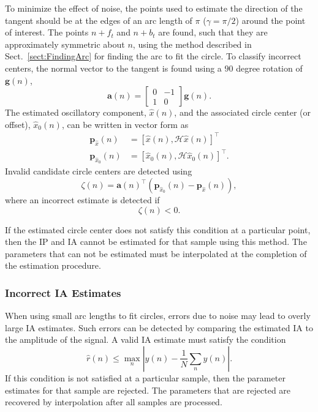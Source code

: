 \documentclass[11pt,draftcls,onecolumn]{IEEEtran}
\begin{document}
To minimize the effect of noise, the points used to estimate the direction of the tangent should be at the edges of an arc length of $\pi$ ($\gamma = \pi/2$) around the point of interest. The points $n+f_t$ and $n+b_t$ are found, such that they are approximately symmetric about $n$, using the method described in Sect.~\ref{sect:FindingArc} for finding the arc to fit the circle. To classify incorrect centers, the normal vector to the tangent is found using a $90$ degree rotation of $\mathbf{g}(n)$,
\begin{equation}
	\mathbf{a}\left(n\right) = \left[\begin{array}{cc}
	0 & -1 \\
	1 & 0\end{array}\right]\mathbf{g}(n).
\end{equation}
The estimated oscillatory component, $\hat{x}(n)$, and the associated circle center (or offset), $\hat{x}_0(n)$, can be written in vector form as
\begin{align}
	\mathbf{p}_{\hat{x}}(n) &= \left[\hat{x}\left(n\right),\mathcal{H}\hat{x}\left(n\right)\right]^{\top} \\ 
	\mathbf{p}_{\hat{x}_0}\left(n\right) &= \left[\hat{x}_0\left(n\right), \mathcal{H}\hat{x}_0\left(n\right)\right]^{\top}. 
\end{align}
Invalid candidate circle centers are detected using 
\begin{equation}
    \zeta(n) = \mathbf{a}\left( n\right)^{\top}\left( \mathbf{p}_{\hat{x}_0}\left( n \right) - \mathbf{p}_{\hat{x}}\left( n\right) \right),
\end{equation}
where an incorrect estimate is detected if
\begin{equation}\label{eq:IncorrectSideClassifier}
    \zeta(n) < 0.
\end{equation} 

If the estimated circle center does not satisfy this condition at a particular point, then the IP and IA cannot be estimated for that sample using this method. The parameters that can not be estimated must be interpolated at the completion of the estimation procedure. 

\subsubsection{Incorrect IA Estimates}
When using small arc lengths to fit circles, errors due to noise may lead to overly large IA estimates. Such errors can be detected by comparing the estimated IA to the amplitude of the signal. A valid IA estimate must satisfy the condition
\begin{equation}\label{eq:bound_on_IA_estimate}
	\hat{r}(n) \leq \max_n\left|y(n)-\frac{1}{N}\sum_ny(n)\right|.
\end{equation}
If this condition is not satisfied at a particular sample, then the parameter estimates for that sample are rejected. The parameters that are rejected are recovered by interpolation after all samples are processed.   
\end{document}

